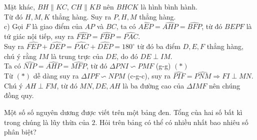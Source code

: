 \begin{ex}
{	Mặt khác, $BH\parallel KC$, $CH\parallel KB$ nên $BHCK$ là hình bình hành.\\
	Từ đó $H,M,K$ thẳng hàng. Suy ra $P,H,M$ thẳng hàng.\\
	c) Gọi $F$ là giao điểm của $AP$ và $BC$, ta có $\widehat{AEP}=\widehat{AHP}=\widehat{BFP}$, từ đó $BEPF$ là tứ giác nội tiếp, suy ra $\widehat{FEP}=\widehat{FBP}=\widehat{PAC}$.\\
	Suy ra $\widehat{FEP}+\widehat{DEP}=\widehat{PAC}+\widehat{DEP}=180^\circ$ từ đó ba điểm $D,E,F$ thẳng hàng, chú ý rằng $IM$ là trung trực của $DE$, do đó $DE\perp IM$.\\
	Ta có $\widehat{NIP}=\widehat{AHP}=\widehat{MFP}$, từ đó $\Delta PNI\backsim PMF$ (g-g) $(*)$\\
	Từ $(*)$ dễ dàng suy ra $\Delta IPF \backsim NPM$ (c-g-c), suy ra $\widehat{PIF}=\widehat{PNM}\Rightarrow FI\perp MN$.\\
	Chú ý $AH\perp FM$, từ đó $MN,DE,AH$ là ba đường cao của $\Delta IMF$ nên chúng đồng quy.
	}
\end{ex}

\begin{ex}%
	Một số số nguyên dương được viết trên một bảng đen. Tổng của hai số bất kì trong chúng là lũy thừa của $2$. Hỏi trên bảng có thể có nhiều nhất bao nhiêu số phân biệt?
\end{ex}



